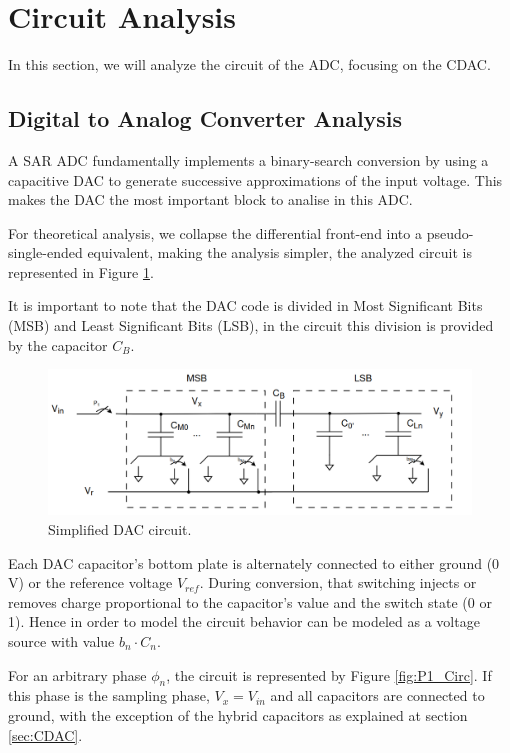 \section{Circuit Analysis}
\label{sec:circuit_analysis}

In this section, we will analyze the circuit of the ADC, focusing on the CDAC.

\subsection{Digital to Analog Converter Analysis}

A SAR ADC fundamentally implements a binary-search conversion by using a capacitive DAC to generate successive approximations of the input voltage. This makes the DAC the most important block to analise in this ADC. 

For theoretical analysis, we collapse the differential front-end into a pseudo-single-ended equivalent, making the analysis simpler, the analyzed circuit is represented in Figure \ref{fig:DAC_Circ}. 

It is important to note that the DAC code is divided in Most Significant Bits (MSB) and Least Significant Bits (LSB), in the circuit this division is provided by the capacitor $C_B$.

\begin{figure}[H]
    \centering
    \includegraphics*[scale = 0.35]{Images/DacCirc.png}
    \caption{Simplified DAC circuit.}
    \label{fig:DAC_Circ}
\end{figure}

Each DAC capacitor's bottom plate is alternately connected to either ground (0 V) or the reference voltage $V_{ref}$. During conversion, that switching injects or removes charge proportional to the capacitor's value and the switch state (0 or 1). Hence in order to model the circuit behavior can be modeled as a voltage source with value $b_n\cdot C_n$. 


For an arbitrary phase $\phi_n$, the circuit is represented by Figure \ref{fig:P1_Circ}. If this phase is the sampling phase, $V_x = V_{in}$ and all capacitors are connected to ground, with the exception of the hybrid capacitors as explained at section \ref{sec:CDAC}.

